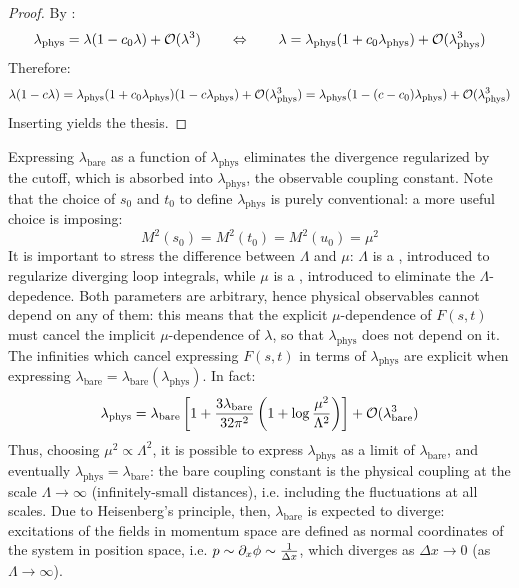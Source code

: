 \begin{proofbox}
  \begin{proof}
    By :
    \begin{equation*}
      \lambda_\text{phys} = \lambda (1 - c_0 \lambda) + \mathcal{O}(\lambda^3)
      \qquad \Leftrightarrow \qquad
      \lambda = \lambda_\text{phys} (1 + c_0 \lambda_\text{phys}) + \mathcal{O}(\lambda_\text{phys}^3)
    \end{equation*}
    Therefore:
    \begin{equation*}
      \lambda (1 - c \lambda) = \lambda_\text{phys} (1 + c_0 \lambda_\text{phys}) (1 - c \lambda_\text{phys}) + \mathcal{O}(\lambda_\text{phys}^3) = \lambda_\text{phys} (1 - (c - c_0) \lambda_\text{phys}) + \mathcal{O}(\lambda_\text{phys}^3)
    \end{equation*}
    Inserting  yields the thesis.
  \end{proof}
\end{proofbox}

Expressing $ \lambda_\text{bare} $ as a function of $ \lambda_\text{phys} $ eliminates the divergence regularized by the cutoff, which is absorbed into $ \lambda_\text{phys} $, the observable coupling constant. Note that the choice of $ s_0 $ and $ t_0 $ to define $ \lambda_\text{phys} $ is purely conventional: a more useful choice is imposing:
\begin{equation}
  M^2(s_0) = M^2(t_0) = M^2(u_0) = \mu^2
\end{equation}
It is important to stress the difference between $ \Lambda $ and $ \mu $: $ \Lambda $ is a , introduced to regularize diverging loop integrals, while $ \mu $ is a , introduced to eliminate the $ \Lambda $-depedence\footnotemark. Both parameters are arbitrary, hence physical observables cannot depend on any of them: this means that the explicit $ \mu $-dependence of $ F(s,t) $ must cancel the implicit $ \mu $-dependence of $ \lambda $, so that $ \lambda_\text{phys} $ does not depend on it. \\
The infinities which cancel expressing $ F(s,t) $ in terms of $ \lambda_\text{phys} $ are explicit when expressing $ \lambda_\text{bare} = \lambda_\text{bare}(\lambda_\text{phys}) $. In fact:
\begin{equation*}
  \lambda_\text{phys} = \lambda_\text{bare} \left[ 1 + \frac{3\lambda_\text{bare}}{32\pi^2} \left( 1 + \log \frac{\mu^2}{\Lambda^2} \right) \right] + \mathcal{O}(\lambda_\text{bare}^3)
\end{equation*}
Thus, choosing $ \mu^2 \propto \Lambda^2 $, it is possible to express $ \lambda_\text{phys} $ as a limit of $ \lambda_\text{bare} $, and eventually $ \lambda_\text{phys} = \lambda_\text{bare} $: the bare coupling constant is the physical coupling at the scale $ \Lambda \rightarrow \infty $ (infinitely-small distances), i.e. including the fluctuations at all scales. Due to Heisenberg's principle, then, $ \lambda_\text{bare} $ is expected to diverge: excitations of the fields in momentum space are defined as normal coordinates of the system in position space, i.e. $ p \sim \partial_x \phi \sim \frac{1}{\Delta x} $, which diverges as $ \Delta x \rightarrow 0 $ (as $ \Lambda \rightarrow \infty $).

